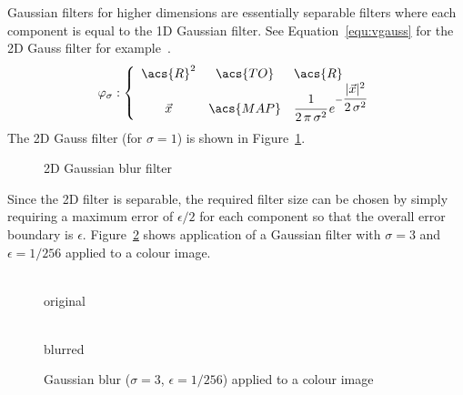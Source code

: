 \documentclass[12pt,a4paper,oneside,openright]{book}
\newcommand{\equ}[1]{Equation~\ref{equ:#1}}
\newcommand{\fig}[1]{Figure~\ref{fig:#1}}
\begin{document}
\begin{CJK}{UTF8}{}
Gaussian filters for higher dimensions are essentially separable filters where each component is equal to the \ac{1D} Gaussian filter. See \equ{vgauss} for the \ac{2D} Gauss filter for example~\citep{stoch}.
\begin{equation}\label{equ:vgauss}
  \varphi_\sigma:\left\{\begin{array}{ccl}\acs{R}^2&\acs{TO}&\acs{R}\\\vec{x}&\acs{MAP}&\cfrac{1}{2\,\pi\,\sigma^2}\,e^{-\cfrac{|\vec{x}|^2}{2\,\sigma^2}}\end{array}\right.
\end{equation}
The \ac{2D} Gauss filter (for $\sigma=1$) is shown in \fig{vgauss}.
\begin{figure}[htbp]
  \begin{center}
    \caption{\acs{2D} Gaussian blur filter\label{fig:vgauss}}
  \end{center}
\end{figure}
Since the \ac{2D} filter is separable, the required filter size can be chosen by simply requiring a maximum error of $\epsilon/2$ for each component so that the overall error boundary is $\epsilon$. \fig{gaussblur} shows application of a Gaussian filter with $\sigma=3$ and $\epsilon=1/256$ applied to a colour image.
\begin{figure}[htbp]
   \begin{center}
     \begin{minipage}[t]{.495\textwidth}
       \begin{center}
         \\
         original
       \end{center}
     \end{minipage}
     \begin{minipage}[t]{.495\textwidth}
       \begin{center}
         \\
         blurred
       \end{center}
     \end{minipage}
     \caption{Gaussian blur ($\sigma=3$, $\epsilon=1/256$) applied to a colour image\label{fig:gaussblur}}
   \end{center}
\end{figure}


\end{CJK}
\end{document}
